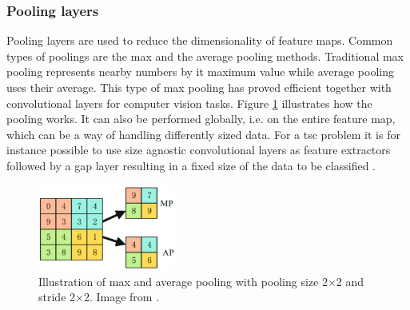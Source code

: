 
\subsubsection{Pooling layers}
Pooling layers are used to reduce the dimensionality of feature maps. Common types of poolings are the max and the average pooling methods. Traditional max pooling represents nearby numbers by it maximum value while average pooling uses their average. This type of max pooling has proved efficient together with convolutional layers for computer vision tasks. Figure \ref{fig:pooling} illustrates how the pooling works. It can also be performed globally, i.e. on the entire feature map, which can be a way of handling differently sized data. For a \gls{tsc} problem it is for instance possible to use size agnostic convolutional layers as feature extractors followed by a \gls{gap} layer resulting in a fixed size of the data to be classified \cite{Chollet2018}.

\begin{figure}
  \centering
  \includegraphics[width=0.4\textwidth]{files/figs/backg/pooling.png}
  \caption{Illustration of max and average pooling with pooling size 2$\times$2 and stride 2$\times$2. Image from \cite{Wang2018}.}
  \label{fig:pooling}
\end{figure}


